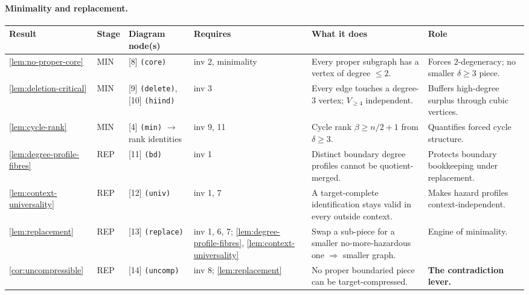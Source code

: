 \documentclass[11pt]{article}
\begin{document}
\paragraph{Minimality and replacement.}
{\scriptsize\setlength{\tabcolsep}{3pt}
\begin{longtable}{L{0.10\textwidth} C{0.045\textwidth} L{0.13\textwidth} L{0.135\textwidth} L{0.28\textwidth} L{0.20\textwidth}}
\toprule
\textbf{Result} & \textbf{Stage} & \textbf{Diagram node(s)} & \textbf{Requires} & \textbf{What it does} & \textbf{Role} \\
\midrule
\endhead
\cref{lem:no-proper-core} & MIN & [8] \texttt{(core)} & inv 2, minimality & Every proper subgraph has a vertex of degree $\le2$. & Forces $2$-degeneracy; no smaller $\delta\ge3$ piece. \\
\cref{lem:deletion-critical} & MIN & [9] \texttt{(delete)}, [10] \texttt{(hiind)} & inv 3 & Every edge touches a degree-$3$ vertex; $V_{\ge4}$ independent. & Buffers high-degree surplus through cubic vertices. \\
\cref{lem:cycle-rank} & MIN & [4] \texttt{(min)} $\to$ rank identities & inv 9, 11 & Cycle rank $\beta\ge n/2+1$ from $\delta\ge3$. & Quantifies forced cycle structure. \\
\cref{lem:degree-profile-fibres} & REP & [11] \texttt{(bd)} & inv 1 & Distinct boundary degree profiles cannot be quotient-merged. & Protects boundary bookkeeping under replacement. \\
\cref{lem:context-universality} & REP & [12] \texttt{(univ)} & inv 1, 7 & A target-complete identification stays valid in every outside context. & Makes hazard profiles context-independent. \\
\cref{lem:replacement} & REP & [13] \texttt{(replace)} & inv 1, 6, 7; \cref{lem:degree-profile-fibres}, \cref{lem:context-universality} & Swap a sub-piece for a smaller no-more-hazardous one $\Rightarrow$ smaller graph. & Engine of minimality. \\
\cref{cor:uncompressible} & REP & [14] \texttt{(uncomp)} & inv 8; \cref{lem:replacement} & No proper boundaried piece can be target-compressed. & \textbf{The contradiction lever.} \\
\bottomrule
\end{longtable}
}
\end{document}

